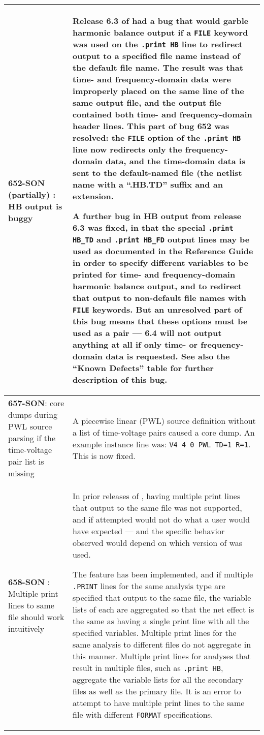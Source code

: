 {\begin{longtable}[h] {>{\raggedright\small}m{2in}|>{\raggedright\let\\\tabularnewline\small}m{3.5in}}
     \textbf{652-SON (partially) }: HB output is buggy & Release 6.3 of
     \Xyce{} had a bug that would garble harmonic balance output if a
     \texttt{FILE} keyword was used on the \texttt{.print HB} line to redirect
     output to a specified file name instead of the default file name.  The
     result was that time- and frequency-domain data were improperly placed on
     the same line of the same output file, and the output file contained both
     time- and frequency-domain header lines.  This part of bug 652 was
     resolved: the \texttt{FILE} option of the \texttt{.print HB} line now
     redirects only the frequency-domain data, and the time-domain data is sent
     to the default-named file (the netlist name with a ``.HB.TD'' suffix and
     an extension.

     A further bug in HB output from release 6.3 was fixed, in that the special
     \texttt{.print HB\_TD} and \texttt{.print HB\_FD} output lines may be used
     as documented in the Reference Guide in order to specify different
     variables to be printed for time- and frequency-domain harmonic balance
     output, and to redirect that output to non-default file names with
     \texttt{FILE} keywords.  But an unresolved part of this bug means that
     these options must be used as a pair --- \Xyce{} 6.4 will not output
     anything at all if only time- or frequency-domain data is requested.  See
     also the ``Known Defects'' table for further description of this bug.  \\
     \hline

     \textbf{657-SON}: \Xyce{} core dumps during PWL source parsing if the
     time-voltage pair list is missing & A piecewise linear (PWL) source
     definition without a list of time-voltage pairs caused a core dump.  An
     example instance line was: \texttt{V4 4 0 PWL TD=1 R=1}. This is now
     fixed.  
     \\ \hline

     \textbf{658-SON }: Multiple print lines to same file should work
     intuitively & In prior releases of \Xyce{}, having multiple print lines
     that output to the same file was not supported, and if attempted would not
     do what a user would have expected --- and the specific behavior observed
     would depend on which version of \Xyce{} was used.  

     The feature has been implemented, and if multiple \texttt{.PRINT} lines
     for the same analysis type are specified that output to the same file, the
     variable lists of each are aggregated so that the net effect is the same
     as having a single print line with all the specified variables.   Multiple
     print lines for the same analysis to different files do not aggregate in
     this manner.  Multiple print lines for analyses that result in multiple
     files, such as \texttt{.print HB}, aggregate the variable lists for all
     the secondary files as well as the primary file.  It is an error to
     attempt to have multiple print lines to the same file with different
     \texttt{FORMAT} specifications.  
     \\ \hline


\end{longtable}}
